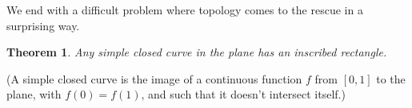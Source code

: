 \documentclass[12pt,twoside]{article}
\theoremstyle{norm}
\newtheorem{thm}{Theorem}[section]
\begin{document}
We end with a difficult problem where topology comes to the rescue in a surprising way.
\begin{thm}
Any simple closed curve in the plane has an inscribed rectangle.
\end{thm}
\begin{figure}[h!]
\end{figure}
(A simple closed curve is the image of a continuous function $f$ from $[0,1]$ to the plane, with $f(0)=f(1)$, and such that it doesn't intersect itself.)
\end{document}
